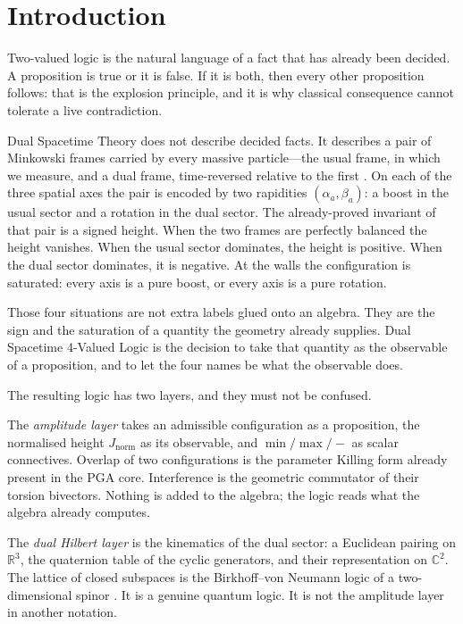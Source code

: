 \documentclass[a4paper]{article}
\theoremstyle{definition}
\newcommand{\Jnorm}{J_{\mathrm{norm}}}
\begin{document}
\section{Introduction}
\label{sec:position}

Two-valued logic is the natural language of a fact that has already
been decided. A proposition is true or it is false. If it is both, then
every other proposition follows: that is the explosion principle, and
it is why classical consequence cannot tolerate a live contradiction.

Dual Spacetime Theory does not describe decided facts. It describes a
pair of Minkowski frames carried by every massive particle---the usual
frame, in which we measure, and a dual frame, time-reversed relative to
the first \cite{DST2025,Diophantine2026}. On each of the three spatial
axes the pair is encoded by two rapidities \((\alpha_a,\beta_a)\): a
boost in the usual sector and a rotation in the dual sector. The
already-proved invariant of that pair is a signed height. When the two
frames are perfectly balanced the height vanishes. When the usual
sector dominates, the height is positive. When the dual sector
dominates, it is negative. At the walls the configuration is saturated:
every axis is a pure boost, or every axis is a pure rotation.

Those four situations are not extra labels glued onto an algebra. They
are the sign and the saturation of a quantity the geometry already
supplies. Dual Spacetime 4-Valued Logic is the decision to take that
quantity as the observable of a proposition, and to let the four names
be what the observable does.

The resulting logic has two layers, and they must not be confused.

The \emph{amplitude layer} takes an admissible configuration as a
proposition, the normalised height \(\Jnorm\) as its observable, and
\(\min/\max/-\) as scalar connectives. Overlap of two configurations is
the parameter Killing form already present in the PGA core. Interference
is the geometric commutator of their torsion bivectors. Nothing is added
to the algebra; the logic reads what the algebra already computes.

The \emph{dual Hilbert layer} is the kinematics of the dual sector: a
Euclidean pairing on \(\mathbb{R}^3\), the quaternion table of the
cyclic generators, and their representation on \(\mathbb{C}^2\). The
lattice of closed subspaces is the Birkhoff--von Neumann logic of a
two-dimensional spinor \cite{BvN1936}. It is a genuine quantum logic.
It is not the amplitude layer in another notation.
\end{document}
